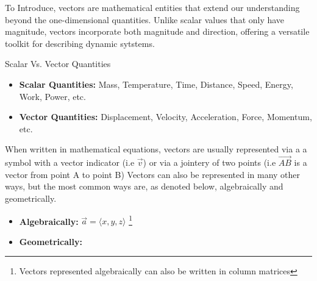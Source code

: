 \documentclass[12.5pt]{article}
\begin{document}
        \begin{flushleft}

            To Introduce, vectors are mathematical entities that extend our understanding beyond the 
            one-dimensional quantities. Unlike scalar values that only have magnitude, 
            vectors incorporate both magnitude and direction, offering a versatile toolkit
            for describing dynamic sytstems. 

            \begin{mdframed}
                Scalar Vs. Vector Quantities
                \begin{itemize}
                    \item \textbf{Scalar Quantities:} Mass, Temperature, Time, Distance, Speed, 
                    Energy, Work, Power, etc.
                    \item \textbf{Vector Quantities:} Displacement, Velocity, Acceleration, 
                    Force, Momentum, etc.
                \end{itemize}
            \end{mdframed}

            When written in mathematical equations, vectors are usually represented via a a symbol with a vector indicator (i.e $\vec{v}$)
            or via a jointery of two points (i.e $\vec{AB}$ is a vector from point A to point B) Vectors 
            can also be represented in many other ways, but the most common ways are, as denoted below, algebraically and geometrically. 

            \begin{itemize}

                \item \textbf{Algebraically:} $\vec{a} = \langle x, y, z \rangle$ \footnote{Vectors represented algebraically can also be written in column matrices}

                \item { \textbf{Geometrically:} 

                    \begin{center}

                        \begin{tikzpicture}
                        

\end{tikzpicture}
\end{center}}
\end{itemize}
\end{flushleft}
\end{document}
